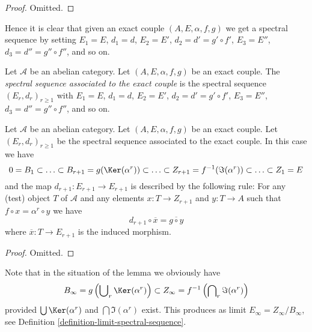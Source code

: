 \begin{proof}
Omitted.
\end{proof}

\noindent
Hence it is clear that given an exact couple $(A, E, \alpha, f, g)$
we get a spectral sequence by setting $E_1 = E$, $d_1 = d$,
$E_2 = E'$, $d_2 = d' = g' \circ f'$, $E_3 = E''$, $d_3 = d'' = g'' \circ f''$,
and so on.

\begin{definition}
\label{definition-spectral-sequence-associated-exact-couple}
Let $\mathcal{A}$ be an abelian category.
Let $(A, E, \alpha, f, g)$ be an exact couple.
The {\it spectral sequence associated to the exact couple}
is the spectral sequence $(E_r, d_r)_{r \geq 1}$ with
$E_1 = E$, $d_1 = d$, $E_2 = E'$, $d_2 = d' = g' \circ f'$,
$E_3 = E''$, $d_3 = d'' = g'' \circ f''$,
and so on.
\end{definition}

\begin{lemma}
\label{lemma-spectral-sequence-associated-exact-couple}
Let $\mathcal{A}$ be an abelian category.
Let $(A, E, \alpha, f, g)$ be an exact couple.
Let $(E_r, d_r)_{r \geq 1}$ be the spectral sequence
associated to the exact couple.
In this case we have
$$
0 = B_1 \subset \ldots \subset
B_{r + 1} = g(\Ker(\alpha^r))
\subset \ldots \subset
Z_{r + 1} = f^{-1}(\Im(\alpha^r))
\subset \ldots \subset Z_1 = E
$$
and the map $d_{r + 1} : E_{r + 1} \to E_{r + 1}$
is described by the following rule:
For any (test) object $T$ of $\mathcal{A}$ and any elements
$x : T \to Z_{r + 1}$ and $y : T \to A$ such that
$f \circ x = \alpha^r \circ y$ we have
$$
d_{r + 1} \circ \overline{x} = \overline{g \circ y}
$$
where $\overline{x} : T \to E_{r + 1}$ is the
induced morphism.
\end{lemma}

\begin{proof}
Omitted.
\end{proof}

\noindent
Note that in the situation of the lemma we obviously have
$$
B_\infty = g\left(\bigcup\nolimits_r \Ker(\alpha^r)\right)
\subset
Z_\infty = f^{-1}\left(\bigcap\nolimits_r \Im(\alpha^r)\right)
$$
provided $\bigcup \Ker(\alpha^r)$ and $\bigcap \Im(\alpha^r)$ exist.
This produces as limit $E_\infty = Z_\infty / B_\infty$, see
Definition \ref{definition-limit-spectral-sequence}.

